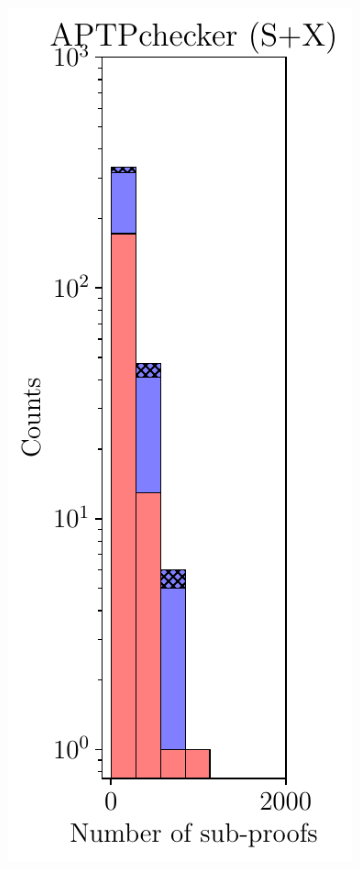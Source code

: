 \documentclass[oneside,11pt,dvipsnames]{book}
\begin{document}
\begin{figure}[t]
\begin{subfigure}{0.4\linewidth}
\begin{minipage}[t]{0.235\textwidth}
        \includegraphics[width=\linewidth]{figure/SUB_PROOFS_SX.pdf}

\end{minipage}
\end{subfigure}
\end{figure}
\end{document}
